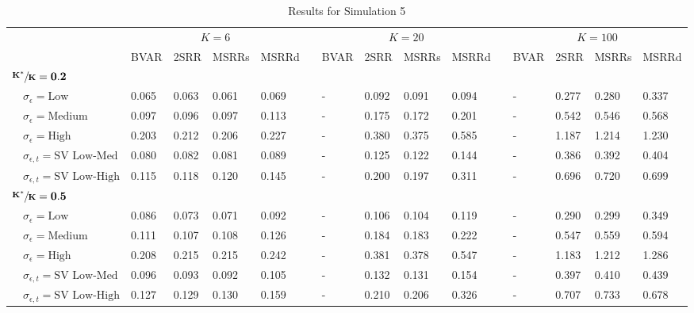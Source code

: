 \begin{table}[!tbp]
\caption{Results for Simulation 5\label{s1_table}} 
\begin{center}
\begin{tabular}{lllllcllllcllll}
\hline\hline
\multicolumn{1}{l}{\bfseries }&\multicolumn{4}{c}{\bfseries $K=6$}&\multicolumn{1}{c}{\bfseries }&\multicolumn{4}{c}{\bfseries $K=20$}&\multicolumn{1}{c}{\bfseries }&\multicolumn{4}{c}{\bfseries $K=100$}\tabularnewline
\cline{2-5} \cline{7-10} \cline{12-15}
\multicolumn{1}{l}{}&\multicolumn{1}{c}{BVAR}&\multicolumn{1}{c}{2SRR}&\multicolumn{1}{c}{MSRRs}&\multicolumn{1}{c}{MSRRd}&\multicolumn{1}{c}{}&\multicolumn{1}{c}{BVAR}&\multicolumn{1}{c}{2SRR}&\multicolumn{1}{c}{MSRRs}&\multicolumn{1}{c}{MSRRd}&\multicolumn{1}{c}{}&\multicolumn{1}{c}{BVAR}&\multicolumn{1}{c}{2SRR}&\multicolumn{1}{c}{MSRRs}&\multicolumn{1}{c}{MSRRd}\tabularnewline
\hline
{\bfseries $\mathbf{\sfrac{K^*}{K}=0.2}$}&&&&&&&&&&&&&&\tabularnewline
~~$\sigma_{\epsilon} =\text{Low}$& 0.065& 0.063& 0.061& 0.069&&-& 0.092& 0.091& 0.094&&-& 0.277& 0.280& 0.337\tabularnewline
~~$\sigma_{\epsilon} =\text{Medium}$& 0.097& 0.096& 0.097& 0.113&&-& 0.175& 0.172& 0.201&&-& 0.542& 0.546& 0.568\tabularnewline
~~$\sigma_{\epsilon} =\text{High}$& 0.203& 0.212& 0.206& 0.227&&-& 0.380& 0.375& 0.585&&-& 1.187& 1.214& 1.230\tabularnewline
~~$\sigma_{\epsilon,t} = \text{SV Low-Med}$& 0.080& 0.082& 0.081& 0.089&&-& 0.125& 0.122& 0.144&&-& 0.386& 0.392& 0.404\tabularnewline
~~$\sigma_{\epsilon,t}  = \text{SV Low-High}$& 0.115& 0.118& 0.120& 0.145&&-& 0.200& 0.197& 0.311&&-& 0.696& 0.720& 0.699\tabularnewline
\hline
{\bfseries $\mathbf{\sfrac{K^*}{K}=0.5}$}&&&&&&&&&&&&&&\tabularnewline
~~$\sigma_{\epsilon} =\text{Low}$& 0.086& 0.073& 0.071& 0.092&&-& 0.106& 0.104& 0.119&&-& 0.290& 0.299& 0.349\tabularnewline
~~$\sigma_{\epsilon} =\text{Medium}$& 0.111& 0.107& 0.108& 0.126&&-& 0.184& 0.183& 0.222&&-& 0.547& 0.559& 0.594\tabularnewline
~~$\sigma_{\epsilon} =\text{High}$& 0.208& 0.215& 0.215& 0.242&&-& 0.381& 0.378& 0.547&&-& 1.183& 1.212& 1.286\tabularnewline
~~$\sigma_{\epsilon,t} = \text{SV Low-Med}$& 0.096& 0.093& 0.092& 0.105&&-& 0.132& 0.131& 0.154&&-& 0.397& 0.410& 0.439\tabularnewline
~~$\sigma_{\epsilon,t}  = \text{SV Low-High}$& 0.127& 0.129& 0.130& 0.159&&-& 0.210& 0.206& 0.326&&-& 0.707& 0.733& 0.678\tabularnewline

\end{tabular}
\end{center}
\end{table}
